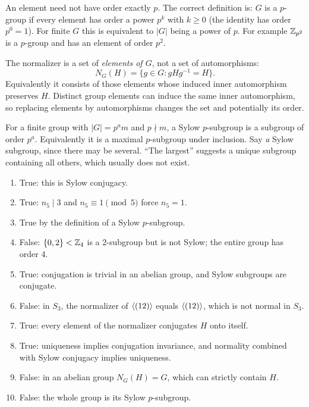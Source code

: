 An element need not have order exactly $p$. The correct definition is: $G$ is a $p$-group if every element has order a power $p^k$ with $k\ge0$ (the identity has order $p^0=1$). For finite $G$ this is equivalent to $|G|$ being a power of $p$. For example $\mathbb{Z}_{p^2}$ is a $p$-group and has an element of order $p^2$.

The normalizer is a set of \emph{elements of $G$}, not a set of automorphisms:
\[
N_G(H)=\{g\in G:gHg^{-1}=H\}.
\]
Equivalently it consists of those elements whose induced inner automorphism preserves $H$. Distinct group elements can induce the same inner automorphism, so replacing elements by automorphisms changes the set and potentially its order.

For a finite group with $|G|=p^a m$ and $p\nmid m$, a Sylow $p$-subgroup is a subgroup of order $p^a$. Equivalently it is a maximal $p$-subgroup under inclusion. Say \emph{a} Sylow subgroup, since there may be several. ``The largest'' suggests a unique subgroup containing all others, which usually does not exist.

\begin{enumerate}[label=\textbf{(\alph*)}]
\item True: this is Sylow conjugacy.
\item True: $n_5\mid3$ and $n_5\equiv1\pmod5$ force $n_5=1$.
\item True by the definition of a Sylow $p$-subgroup.
\item False: $\{0,2\}<\mathbb{Z}_4$ is a 2-subgroup but is not Sylow; the entire group has order 4.
\item True: conjugation is trivial in an abelian group, and Sylow subgroups are conjugate.
\item False: in $S_3$, the normalizer of $\langle (12)\rangle$ equals $\langle (12)\rangle$, which is not normal in $S_3$.
\item True: every element of the normalizer conjugates $H$ onto itself.
\item True: uniqueness implies conjugation invariance, and normality combined with Sylow conjugacy implies uniqueness.
\item False: in an abelian group $N_G(H)=G$, which can strictly contain $H$.
\item False: the whole group is its Sylow $p$-subgroup.
\end{enumerate}

